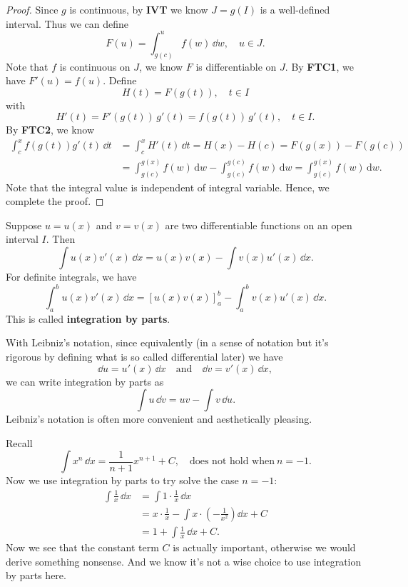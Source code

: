 \documentclass[a4paper]{ctexart}
\begin{document}
    \begin{proof}
        Since $g$ is continuous, by \textbf{IVT} we know $J=g(I)$ is a well-defined interval. Thus we can define
        \[
        F(u)=\int _{g(c)}^u f(w)\, \dd w,\quad u \in J.
        \]
        Note that $f$ is continuous on $J$, we know $F$ is differentiable on $J$. By \textbf{FTC1}, we have $F'(u)=f(u)$. Define
        \[
        H(t) = F(g(t)),\quad t\in I
        \]
        with
        \[
        H'(t)=F'(g(t))\,g'(t)=f(g(t))\,g'(t),\quad t\in I.
        \]
        By \textbf{FTC2}, we know
        \[
        \begin{aligned}
            \int_c^x f(g(t))g'(t)\,\dd t &= \int_c^x H'(t)\,\dd t = H(x)-H(c)=F(g(x))-F(g(c)) \\ &= \int_{g(c)}^{g(x)} f(w)\,\mathrm{d}w - \int_{g(c)}^{g(c)} f(w)\,\mathrm{d}w = \int_{g(c)}^{g(x)} f(w)\,\mathrm{d}w.
        \end{aligned}
        \]
        Note that the integral value is independent of integral variable. Hence, we complete the proof.
    \end{proof}
	\begin{mymthd}
		Suppose $u=u(x)$ and $v=v(x)$ are two differentiable functions on an open interval $I$. Then
		\[
		\int u(x) v'(x)\, \dd x = u(x) v(x) - \int v(x) u'(x)\, \dd x.
		\]
		For definite integrals, we have
		\[
		\int_a^b u(x) v'(x)\, \dd x = \left[ u(x) v(x) \right]_a^b - \int_a^b v(x) u'(x)\, \dd x.
		\]
		This is called \textbf{integration by parts}.
	\end{mymthd}
	\begin{myrmk}
		With Leibniz's notation, since equivalently (in a sense of notation but it's rigorous by defining what is so called differential later) we have
		\[
		\dd u = u'(x)\, \dd x \quad \text{and}\quad \dd v = v'(x)\, \dd x,
		\]
		we can write integration by parts as
		\[
		\int u\, \dd v = uv - \int v\, \dd u.
		\]
		Leibniz's notation is often more convenient and aesthetically pleasing.
	\end{myrmk}
	\begin{myex}
		Recall
		\[
		\int x^n\, \dd x = \frac{1}{n+1} x^{n+1} + C,\quad \text{does not hold when}\ n=-1.
		\]
		Now we use integration by parts to try solve the case $n=-1$:
		\[
		\begin{aligned}
			\int \frac{1}{x}\, \dd x &= \int 1 \cdot \frac{1}{x}\, \dd x\\[6pt]
			&= x \cdot \frac{1}{x} - \int x \cdot \left( -\frac{1}{x^2} \right) \dd x + C\\[6pt]
			&= 1 + \int \frac{1}{x}\, \dd x + C.
		\end{aligned}
		\]
		Now we see that the constant term $C$ is actually important, otherwise we would derive something nonsense. And we know it's not a wise choice to use integration by parts here. 
	\end{myex}
\end{document}
